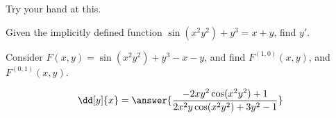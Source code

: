 \documentclass{ximera}
\begin{document}
Try your hand at this.

\begin{question}
  Given the implicitly defined function $\sin(x^2y^2)+y^3=x+y$, find
  $y'$.
  \begin{hint}
    Consider $F(x,y) = \sin(x^2y^2)+y^3-x-y$, and find
    $F^{(1,0)}(x,y)$, and $F^{(0,1)}(x,y)$.
  \end{hint}
  \begin{prompt}
  \[
  \dd[y]{x} = \answer{\frac{-2xy^2\cos(x^2y^2)+1}{2x^2y\cos(x^2y^2)+3y^2-1}}
  \]
  \end{prompt}
\end{question}

\end{document}
